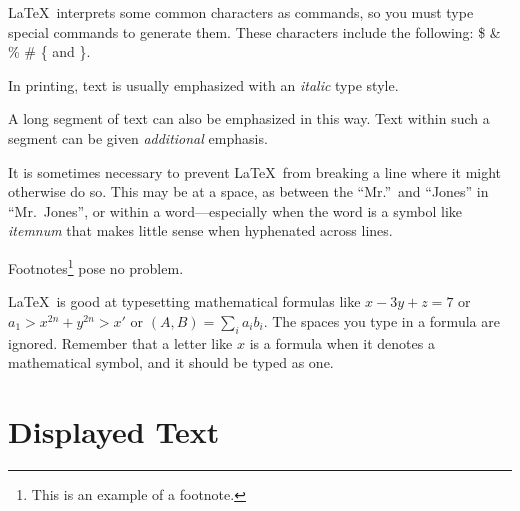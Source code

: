 \documentclass{article}      %
\newcommand{\ip}[2]{(#1, #2)}
\begin{document}
\LaTeX\ interprets some common characters as
commands, so you must type special commands to
generate them.  These characters include the
following:
       \$ \& \% \# \{ and \}.

In printing, text is usually emphasized with an
       \emph{italic}
type style.

\begin{em}
   A long segment of text can also be emphasized
   in this way.  Text within such a segment can be
   given \emph{additional} emphasis.
\end{em}

It is sometimes necessary to prevent \LaTeX\ from
breaking a line where it might otherwise do so.
This may be at a space, as between the ``Mr.''\ and
``Jones'' in
       ``Mr.~Jones'',        %
or within a word---especially when the word is a
symbol like
       \mbox{\emph{itemnum}}
that makes little sense when hyphenated across
lines.

Footnotes\footnote{This is an example of a footnote.}
pose no problem.

\LaTeX\ is good at typesetting mathematical formulas
like
       \( x-3y + z = 7 \)
or
       \( a_{1} > x^{2n} + y^{2n} > x' \)
or
       \( \ip{A}{B} = \sum_{i} a_{i} b_{i} \).
The spaces you type in a formula are
ignored.  Remember that a letter like
       $x$                   %
is a formula when it denotes a mathematical
symbol, and it should be typed as one.

\section{Displayed Text}
\end{document}
